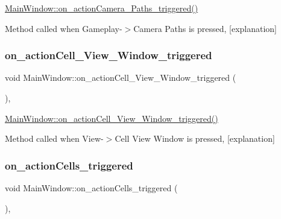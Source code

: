\hyperlink{class_main_window_a11bc264b622ed0f4e4edc3ec2924b799}{Main\+Window\+::on\+\_\+action\+Camera\+\_\+\+Paths\+\_\+triggered()} 

Method called when Gameplay-\/$>$Camera Paths is pressed, \mbox{[}explanation\mbox{]} \mbox{\label{class_main_window_acca897b6aa864947f35e22163eb6a0a7}} 
\subsubsection{\texorpdfstring{on\+\_\+action\+Cell\+\_\+\+View\+\_\+\+Window\+\_\+triggered}{on\_actionCell\_View\_Window\_triggered}}
{\footnotesize\ttfamily void Main\+Window\+::on\+\_\+action\+Cell\+\_\+\+View\+\_\+\+Window\+\_\+triggered (\begin{DoxyParamCaption}{ }\end{DoxyParamCaption})\hspace{0.3cm}{\ttfamily [private]}, {\ttfamily [slot]}}



\hyperlink{class_main_window_acca897b6aa864947f35e22163eb6a0a7}{Main\+Window\+::on\+\_\+action\+Cell\+\_\+\+View\+\_\+\+Window\+\_\+triggered()} 

Method called when View-\/$>$Cell View Window is pressed, \mbox{[}explanation\mbox{]} \mbox{\label{class_main_window_abe162b3673599552213251a049a93eac}} 
\subsubsection{\texorpdfstring{on\+\_\+action\+Cells\+\_\+triggered}{on\_actionCells\_triggered}}
{\footnotesize\ttfamily void Main\+Window\+::on\+\_\+action\+Cells\+\_\+triggered (\begin{DoxyParamCaption}{ }\end{DoxyParamCaption})\hspace{0.3cm}{\ttfamily [private]}, {\ttfamily [slot]}}



